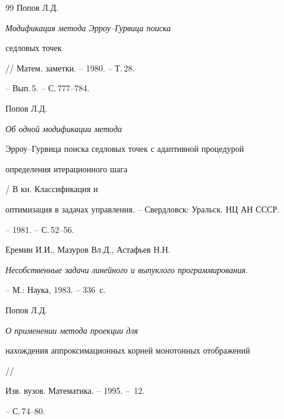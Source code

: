 \begin{thebibliography}{99}
 Попов Л.Д. {\em Модификация метода Эрроу--Гурвица поиска


седловых точек} // Матем. заметки. -- 1980. -- Т.\,28.


-- Вып.\,5. -- С.\,777--784.





 Попов Л.Д. {\em Об одной модификации метода


Эрроу--Гурвица поиска седловых точек с адаптивной процедурой


определения итерационного шага} / В кн. Классификация и


оптимизация в задачах управления. -- Свердловск: Уральск. НЦ АН СССР.


-- 1981. -- С.\,52--56.





 Еремин И.И., Мазуров Вл.Д., Астафьев Н.Н.


{\em Несобственные задачи линейного и выпуклого программирования}.


-- М.: Наука, 1983. -- 336~с.





 Попов Л.Д. {\em О применении метода проекции для


нахождения аппроксимационных корней монотонных отображений} //


Изв. вузов. Математика. -- 1995. -- \No\,12.


-- С.\,74--80.





\end{thebibliography}





\vskip 2cm














\label{end}






